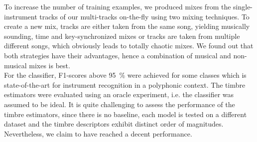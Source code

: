 To increase the number of training examples, we produced mixes from the single-instrument tracks of our multi-tracks on-the-fly using two mixing techniques. To create a new mix, tracks are either taken from the same song, yielding musically sounding, time and key-synchronized mixes or tracks are taken from multiple different songs, which obviously leads to totally chaotic mixes. We found out that both strategies have their advantages, hence a combination of musical and non-musical mixes is best.\\

For the classifier, F1-scores above \SI{95}{\percent} were achieved for some classes which is state-of-the-art for instrument recognition in a polyphonic context. The timbre estimators were evaluated using an oracle experiment, i.e. the classifier was assumed to be ideal. It is quite challenging to assess the performance of the timbre estimators, since there is no baseline, each model is tested on a different dataset and the timbre descriptors exhibit distinct order of magnitudes. Nevertheless, we claim to have reached a decent performance.\\



